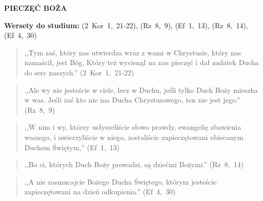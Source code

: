 \documentclass[10pt,a4paper,oneside]{article}
\begin{document}
\centerline{\textbf{\MakeUppercase{Pieczęć Boża}}}
\begin{center}
\textbf{Wersety do studium:} \mbox{(2 Kor 1, 21-22)}, \mbox{(Rz 8, 9)}, \mbox{(Ef 1, 13)}, \mbox{(Rz 8, 14)}, \mbox{(Ef 4, 30)}
\end{center}
\begin{quote}
,,Tym zaś, który nas utwierdza wraz z wami w Chrystusie, który nas namaścił, jest Bóg, Który też wycisnął na nas pieczęć i dał zadatek Ducha do serc naszych.'' \mbox{(2 Kor 1, 21-22)}
\end{quote}
\begin{quote}
,,Ale wy nie jesteście w ciele, lecz w Duchu, jeśli tylko Duch Boży mieszka w was. Jeśli zaś kto nie ma Ducha Chrystusowego, ten nie jest jego.'' \mbox{(Rz 8, 9)}
\end{quote}
\begin{quote}
,,W nim i wy, którzy usłyszeliście słowo prawdy, ewangelię zbawienia waszego, i uwierzyliście w niego, zostaliście zapieczętowani obiecanym Duchem Świętym,'' \mbox{(Ef 1, 13)}
\end{quote}
\begin{quote}
,,Bo ci, których Duch Boży prowadzi, są dziećmi Bożymi.'' \mbox{(Rz 8, 14)}
\end{quote}
\begin{quote}
,,A nie zasmucajcie Bożego Ducha Świętego, którym jesteście zapieczętowani na dzień odkupienia.'' \mbox{(Ef 4, 30)}
\end{quote}
\end{document}
